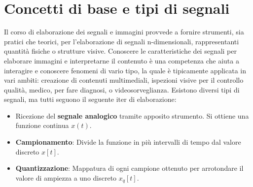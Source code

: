 \section{Concetti di base e tipi di segnali}
Il corso di elaborazione dei segnali e immagini provvede a fornire strumenti, sia pratici che teorici, per l'elaborazione di segnali n-dimensionali,
rappresentanti quantità fisiche o strutture visive. Conoscere le caratteristiche dei segnali per elaborare immagini e interpretarne il contenuto è
una competenza che aiuta a interagire e conoscere fenomeni di vario tipo, la quale è tipicamente applicata in vari ambiti: creazione di contenuti
multimediali, ispezioni visive per il controllo qualità, medico, per fare diagnosi, o videosorveglianza. Esistono diversi tipi di segnali, ma tutti
seguono il seguente iter di elaborazione: \begin{itemize}
	\item Ricezione del \textbf{segnale analogico} tramite apposito strumento. Si ottiene una funzione continua $x(t)$.
	\item \textbf{Campionamento}: Divide la funzione in più intervalli di tempo dal	valore discreto $x[t]$.
	\item \textbf{Quantizzazione}: Mappatura di ogni campione ottenuto per arrotondare il valore di ampiezza a uno discreto $x_q[t]$.
\end{itemize}

